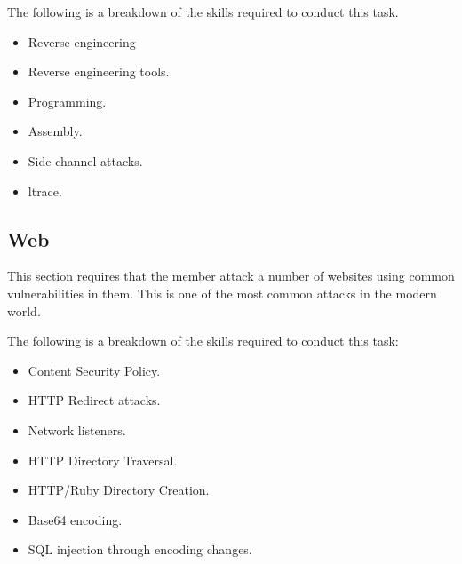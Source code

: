 \documentclass[a4paper,11pt]{report}
\begin{document}
			The following is a breakdown of the skills required to conduct this task. 
			\begin{itemize}
				\item Reverse engineering 
				\item Reverse engineering tools. 
				\item Programming. 
				\item Assembly. 
				\item Side channel attacks. 
				\item ltrace. 
			\end{itemize}
		\subsection{Web}
			This section requires that the member attack a number of websites using common vulnerabilities in them. 
			This is one of the most common attacks in the modern world. 

			The following is a breakdown of the skills required to conduct this task:
			\begin{itemize}
				\item Content Security Policy.
				\item HTTP Redirect attacks. 
				\item Network listeners. 
				\item HTTP Directory Traversal. 
				\item HTTP/Ruby Directory Creation. 
				\item Base64 encoding. 
				\item SQL injection through encoding changes. 
			\end{itemize}
\end{document}
